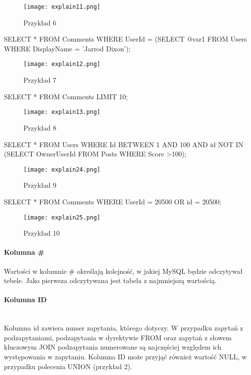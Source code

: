 \begin{figure}[H]
	\texttt{[image: explain11.png]} 
	\caption{Przykład 6}
\end{figure}
\begin{spverbatim}
	SELECT * FROM Comments WHERE UserId = (SELECT @var1 FROM Users WHERE DisplayName = 'Jarrod Dixon');
\end{spverbatim}
\begin{figure}[H]
	\texttt{[image: explain12.png]} 
	\caption{Przykład 7}
\end{figure}
\begin{spverbatim}
SELECT * FROM Comments LIMIT 10;
\end{spverbatim}
\begin{figure}[H]
	\texttt{[image: explain13.png]} 
	\caption{Przykład 8}
\end{figure}
\begin{spverbatim}
	SELECT * FROM Users WHERE Id BETWEEN 1 AND 100 AND 
	id NOT IN (SELECT OwnerUserId FROM Posts WHERE Score >100);
\end{spverbatim}
\begin{figure}[H]
	\texttt{[image: explain24.png]} 
	\caption{Przykład 9}
\end{figure}
\begin{spverbatim}
	SELECT * FROM Comments WHERE UserId = 20500 OR id = 20500;
\end{spverbatim}
\begin{figure}[H]
	\texttt{[image: explain25.png]} 
	\caption{Przykład 10}
\end{figure}

\paragraph{Kolumna \#}
Wartości w kolumnie \# określają kolejność, w jakiej MySQL będzie odczytywał tebele. Jako pierwsza odczytywana jest tabela z najmniejszą wartością.

\paragraph{Kolumna ID}\leavevmode\\
Kolumna id zawiera numer zapytania, którego dotyczy. W przypadku zapytań z podzapytaniami, podzapytania w dyrektywie FROM oraz zapytań z słowem kluczowym JOIN podzapytania numerowane są najczęściej względem ich występowania w zapytaniu. Kolumna ID może przyjąć również wartość NULL, w przypadku polecenia UNION (przykład 2).

